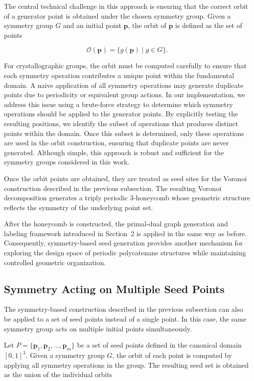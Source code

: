 \documentclass[times,twocolumn,final]{elsarticle}
\begin{document}
The central technical challenge in this approach is ensuring that the
correct orbit of a generator point is obtained under the chosen
symmetry group. Given a symmetry group $G$ and an initial point
$\mathbf{p}$, the orbit of $\mathbf{p}$ is defined as the set of points

\[
\mathcal{O}(\mathbf{p}) = \{ g(\mathbf{p}) \mid g \in G \}.
\]

For crystallographic groups, the orbit must be computed carefully to ensure that each symmetry operation contributes a unique point within the fundamental domain. A naive application of all symmetry operations may generate duplicate points due to periodicity or equivalent group
actions. In our implementation, we address this issue using a brute-force strategy to determine which symmetry operations should be applied to the generator points. By explicitly testing the resulting positions, we identify the subset of operations that produces distinct points within the domain. Once this subset is determined, only these
operations are used in the orbit construction, ensuring that duplicate points are never generated. Although simple, this approach is robust and sufficient for the symmetry groups considered in this work.

Once the orbit points are obtained, they are treated as seed sites for the Voronoi construction described in the previous subsection. The resulting Voronoi decomposition generates a triply periodic 3-honeycomb whose geometric structure reflects the symmetry of the underlying point set.

After the honeycomb is constructed, the primal-dual graph generation and labeling framework introduced in Section~2 is applied in the same way as before. Consequently, symmetry-based seed generation provides another mechanism for exploring the design space of periodic polycatenane structures while maintaining controlled geometric organization.

\subsection{Symmetry Acting on Multiple Seed Points}

The symmetry-based construction described in the previous subsection can also be applied to a set of seed points instead of a single point. In this case, the same symmetry group acts on multiple initial points simultaneously.

Let
$P = \{\mathbf{p}_1,\mathbf{p}_2,\ldots,\mathbf{p}_m\}$
be a set of seed points defined in the canonical domain $[0,1]^3$.
Given a symmetry group $G$, the orbit of each point is computed by
applying all symmetry operations in the group. The resulting seed set
is obtained as the union of the individual orbits
\end{document}

